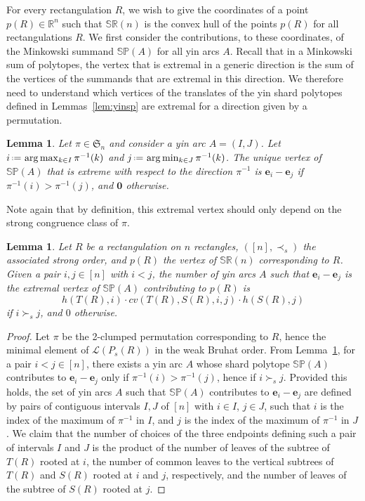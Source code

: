 \documentclass{amsart}
\newtheorem{lemma}[theorem]{Lemma}
\theoremstyle{definition}
\newcommand{\R}{\mathbb{R}} %
\newcommand{\f}[1]{\mathfrak{#1}} %
\newcommand{\eqdef}{\mbox{\,\raisebox{0.2ex}{\scriptsize\ensuremath{\mathrm:}}\ensuremath{=}\,}} %
\newcommand{\polytope}[1]{\mathds{#1}} %
\newcommand{\SRP}{\polytope{SR}} %
\newcommand{\SP}{\polytope{SP}}
\begin{document}
For every rectangulation $R$, we wish to give the coordinates of a point $p(R)\in\R^n$ such that $\SRP(n)$ is the convex hull of the points $p(R)$ for all rectangulations $R$.
We first consider the contributions, to these coordinates, of the Minkowski summand $\SP(A)$ for all yin arcs $A$.
Recall that in a Minkowski sum of polytopes, the vertex that is extremal in a generic direction is the sum of the vertices of the summands that are extremal in this direction.
We therefore need to understand which vertices of the translates of the yin shard polytopes defined in Lemmas~\ref{lem:yinsp} are extremal for a direction given by a permutation.

\begin{lemma}
  \label{lem:yinminmax}
  Let $\pi\in\f{S}_n$ and consider a yin arc $A=(I,J)$.
  Let $i \eqdef \arg\max_{k\in I} \pi^{-1}(k)$ and $j \eqdef \arg\min_{k\in J} \pi^{-1}(k)$.
  The unique vertex of $\SP(A)$ that is extreme with respect to the direction $\pi^{-1}$
  is $\mathbf{e}_i-\mathbf{e}_j$ if $\pi^{-1}(i)>\pi^{-1}(j)$, and $\mathbf{0}$ otherwise.
\end{lemma}

Note again that by definition, this extremal vertex should only depend on the strong congruence class of $\pi$.

\begin{lemma}
  Let $R$ be a rectangulation on $n$ rectangles, $([n],\prec_s)$ the associated strong order, and $p(R)$ the vertex of $\SRP(n)$ corresponding to $R$.
  Given a pair $i,j\in [n]$ with $i<j$, the number of yin arcs $A$ such that $\mathbf{e}_i-\mathbf{e}_j$
  is the extremal vertex of $\SP(A)$ contributing to $p(R)$ is
  \[
    h(T(R), i) \cdot cv (T(R), S(R), i, j)\cdot h(S(R), j) 
  \]
  if $i\succ_s j$, and $0$ otherwise.
\end{lemma}
\begin{proof}
  Let $\pi$ be the 2-clumped permutation corresponding to $R$, hence the minimal element of $\mathcal{L}(P_s(R))$ in the weak Bruhat order.
  From Lemma~\ref{lem:yinminmax}, for a pair $i<j \in [n]$, there exists a yin arc $A$ whose shard polytope $\SP(A)$ contributes to $\mathbf{e}_i-\mathbf{e}_j$ only if
  $\pi^{-1}(i)>\pi^{-1}(j)$, hence if $i\succ_s j$.
  Provided this holds, the set of yin arcs $A$ such that $\SP(A)$ contributes to $\mathbf{e}_i-\mathbf{e}_j$ are defined by pairs of contiguous intervals $I,J$ of $[n]$ with $i\in I$, $j\in J$, such that $i$ is the index of the maximum of $\pi^{-1}$ in $I$, and $j$ is the index of the maximum of $\pi^{-1}$ in $J$.
  We claim that the number of choices of the three endpoints defining such a pair of intervals $I$ and $J$ is the product of the
  number of leaves of the subtree of $T(R)$ rooted at $i$, the number of common leaves to the vertical subtrees of $T(R)$ and $S(R)$ rooted
  at $i$ and $j$, respectively, and the number of leaves of the subtree of $S(R)$ rooted at $j$.
\end{proof}
\end{document}
